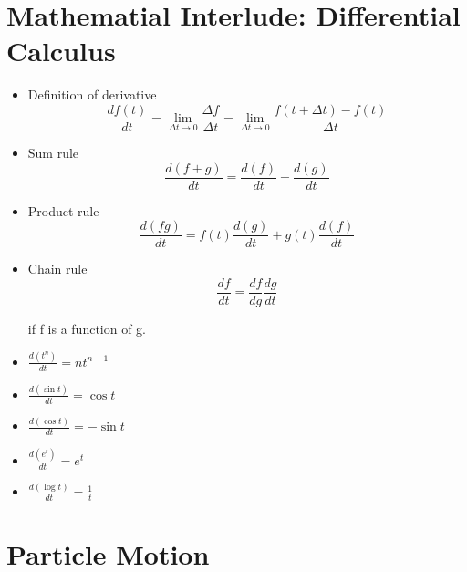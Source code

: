 \documentclass[../main.tex]{subfiles}
\begin{document}
\section{Mathematial Interlude: Differential Calculus}
\begin{itemize}
    \item Definition of derivative
        \begin{equation}
            \frac{d f(t)}{d t}=\lim _{\Delta t \rightarrow 0} \frac{\Delta f}{\Delta t}=\lim _{\Delta t \rightarrow 0} \frac{f(t+\Delta t)-f(t)}{\Delta t}
        \end{equation}

    \item Sum rule
        \begin{equation}
            \frac{d(f+g)}{d t}=\frac{d(f)}{d t}+\frac{d(g)}{d t}
        \end{equation}

    \item Product rule
        \begin{equation}
            \frac{d(f g)}{d t}=f(t) \frac{d(g)}{d t}+g(t) \frac{d(f)}{d t}
        \end{equation}

    \item Chain rule
        \begin{equation}
            \frac{d f}{d t}=\frac{d f}{d g} \frac{d g}{d t}
        \end{equation}

        if f is a function of g.
    \item $\frac{d\left(t^n\right)}{d t}=n t^{n-1}$
    \item $\frac{d(\sin t)}{d t}  =\cos t$ 
    \item $\frac{d(\cos t)}{d t}  =-\sin t$ 
    \item $\frac{d\left(e^t\right)}{d t}  =e^t$
    \item $\frac{d(\log t)}{d t}  =\frac{1}{t}$

\end{itemize}

\section{Particle Motion}
\end{document}
